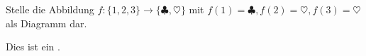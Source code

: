 \documentclass[]{uebungsblatt}
\begin{document}
\begin{exercise}
    Stelle die Abbildung $f\colon\{1,2,3\}\rightarrow\{\clubsuit,\heartsuit\}$ mit $f(1)=\clubsuit, f(2)=\heartsuit, f(3)=\heartsuit$ als Diagramm dar.
    \begin{answerbox}[1in]
    \end{answerbox}
\end{exercise}

\begin{exercise}
    \begin{blanktext}
        Dies ist ein .
    \end{blanktext}
\end{exercise}

\end{document}
